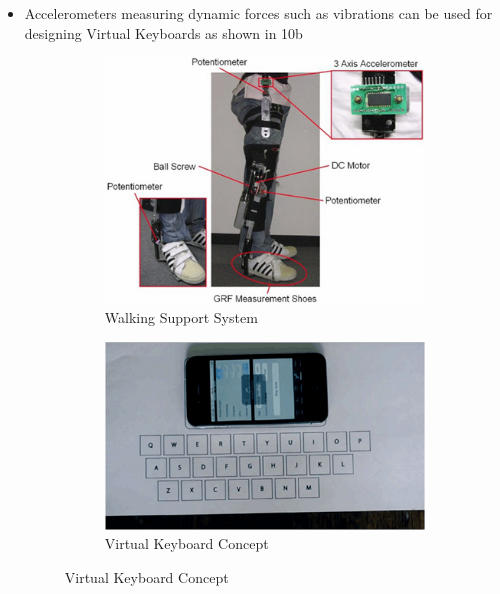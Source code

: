 \documentclass[a4paper,12 pt]{article}
\begin{document}
\begin{itemize}
\begin{itemize}
\item Accelerometers measuring dynamic forces such as vibrations can be used for designing Virtual Keyboards as shown in 10b
\begin{figure}[h]
        \centering
        \begin{subfigure}[b]{0.55\textwidth}
                \includegraphics[width=\textwidth]{accapp.png}
                \caption{Walking Support System}
                \label{fig:11}
        \end{subfigure}%
        \begin{subfigure}[b]{0.40\textwidth}
                \includegraphics[width=\textwidth]{accapp1.png}
                \caption{Virtual Keyboard Concept}
                \label{fig:12}
        \end{subfigure}%

        
\end{figure}
\end{itemize}
\end{itemize}

\pagebreak
\end{document}
